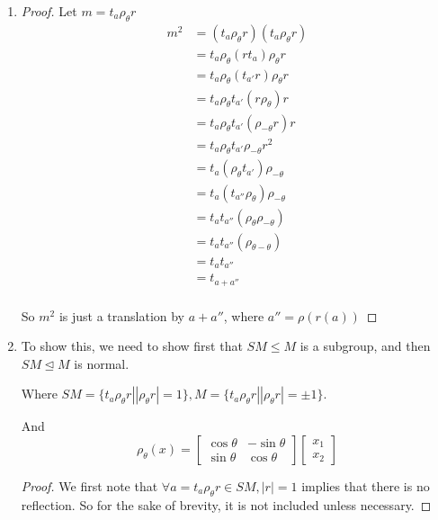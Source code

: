 \documentclass[12pt,letterpaper]{article}
\begin{document}
\begin{enumerate}
    \item
      \begin{proof}
        Let $m = t_a \rho_\theta r$
        \begin{align*}
          m^2 &= (t_a \rho_\theta r)(t_a \rho_\theta r) \\
          &= t_a \rho_\theta (rt_a) \rho_\theta r \\
          &= t_a \rho_\theta (t_{a'}r) \rho_\theta r \\
          &= t_a \rho_\theta t_{a'}(r \rho_\theta) r \\
          &= t_a \rho_\theta t_{a'}( \rho_{-\theta} r) r \\
          &= t_a \rho_\theta t_{a'} \rho_{-\theta} r^2 \\
          &= t_a (\rho_\theta t_{a'}) \rho_{-\theta} \\
          &= t_a (t_{a''} \rho_\theta) \rho_{-\theta} \\
          &= t_a t_{a''} (\rho_\theta \rho_{-\theta}) \\
          &= t_a t_{a''} (\rho_{\theta - \theta}) \\
          &= t_a t_{a''} \\
          &= t_{a + a''} \\
        \end{align*}

        So $m^2$ is just a translation by $a + a''$,
        where $a'' = \rho(r(a))$
      \end{proof}
    \item
      To show this, we need to show first that $SM \le M$ is a subgroup, and then $SM \trianglelefteq M$ is normal.

      Where $SM = \{t_a \rho_\theta r | \left| \rho_\theta r \right| = 1\}, M = \{t_a \rho_\theta r | \left| \rho_\theta r \right| = \pm 1\}$.

      And
      \[
        \rho_\theta(x) =
        \begin{bmatrix}
          \cos{\theta} & -\sin{\theta} \\
          \sin{\theta} & \cos{\theta}
        \end{bmatrix}
        \begin{bmatrix}
          x_1 \\
          x_2
        \end{bmatrix}
      \]

      \begin{proof}

        We first note that $\forall a = t_a \rho_\theta r \in SM, |r| = 1$ implies that there is no reflection.
        So for the sake of brevity, it is not included unless necessary.


\end{proof}
\end{enumerate}
\end{document}
